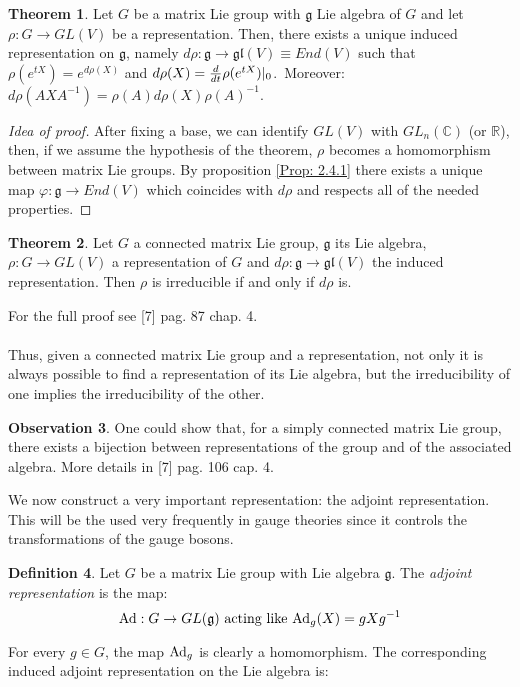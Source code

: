 \documentclass[12pt,a4paper]{report}
\theoremstyle{definition}
\newtheorem{Def}{Definition}[chapter]
\theoremstyle{Theorem}
\newtheorem{Theo}[Def]{Theorem}
\theoremstyle{definition}
\theoremstyle{definition}
\newtheorem{Obs}[Def]{Observation}
\begin{document}
	\begin{Theo}
		Let $G$ be a matrix Lie group with $\mathfrak{g}$ Lie algebra of $G$ and let $\rho:G\rightarrow GL(V)$ be a representation. Then, there exists a unique induced representation on $\mathfrak{g}$, namely $d\rho:\mathfrak{g}\rightarrow \mathfrak{gl}(V)\equiv End(V)$ such that $\rho(e^{tX})=e^{d\rho(X)}$ and $d\rho(X)={d\over dt}\rho(e^{tX})|_0$.\
		Moreover: $d\rho(AXA^{-1})=\rho(A)d\rho(X)\rho(A)^{-1}$.	
	\end{Theo}
	\begin{proof} [Idea of proof]
		After fixing a base, we can identify $GL(V)$ with $GL_n(\mathbb{C})$ (or $\mathbb{R}$), then, if we assume the hypothesis of the theorem, $\rho$ becomes a homomorphism between matrix Lie groups. By proposition \ref{Prop: 2.4.1} there exists a unique map $\varphi:\mathfrak{g}\rightarrow End(V)$ which coincides with $d\rho$ and respects all of the needed properties.
	\end{proof}
	\begin{Theo}\label{Theo: 3.1}
		Let $G$ a connected matrix Lie group, $\mathfrak{g}$ its Lie algebra, $\rho:G\rightarrow GL(V)$ a representation of $G$ and $d\rho:\mathfrak{g}\rightarrow \mathfrak{gl}(V)$ the induced representation. Then $\rho$ is irreducible if and only if $d\rho$ is.
	\end{Theo}
	For the full proof see [7] pag. 87 chap. 4.\\
	\\
	Thus, given a connected matrix Lie group and a representation, not only it is always possible to find a representation of its Lie algebra, but the irreducibility of one implies the irreducibility of the other.
	\begin{Obs}
		One could show that, for a simply connected matrix Lie group, there exists a bijection between representations of the group and of the associated algebra. More details in [7] pag. 106 cap. 4.
	\end{Obs}
	We now construct a very important representation: the adjoint representation. This will be the used very frequently in gauge theories since it controls the transformations of the gauge bosons.
	\begin{Def}
		Let $G$ be a matrix Lie group with Lie algebra $\mathfrak{g}$. The \textit{adjoint representation} is the map:
		$$\hbox{Ad}:G\rightarrow GL(\mathfrak{g})\hbox{ acting like } \hbox{Ad}_g(X)=gXg^{-1}$$
	\end{Def}
	For every $g\in G$, the map $\hbox{Ad}_g$ is clearly a homomorphism. The corresponding induced adjoint representation on the Lie algebra is:
\end{document}

